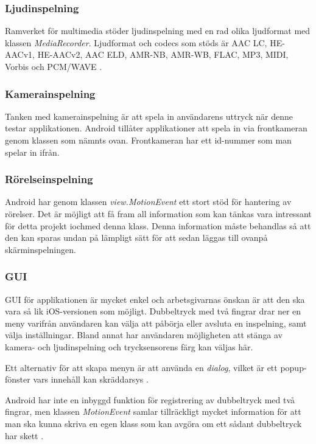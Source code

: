 \subsubsection{Ljudinspelning}
\label{subsubsec:ljudinspelning}
Ramverket för multimedia stöder ljudinspelning med en rad olika ljudformat med klassen \textit{MediaRecorder}. Ljudformat och codecs som stöds är AAC LC, HE-AACv1, HE-AACv2, AAC ELD, AMR-NB, AMR-WB, FLAC, MP3, MIDI, Vorbis och PCM/WAVE \parencite{sound}.

\subsubsection{Kamerainspelning}
\label{subsubsec:kamerainspelning}
Tanken med kamerainspelning är att spela in användarens uttryck när denne testar applikationen. Android tillåter applikationer att spela in via frontkameran genom klassen  \parencite{frontcamera} som nämnts ovan. Frontkameran har ett id-nummer som man spelar in ifrån.

\subsubsection{Rörelseinspelning}
Android har genom klassen \emph{view.MotionEvent}\parencite{motionevent} ett stort stöd för hantering av rörelser. Det är möjligt att få fram all information som kan tänkas vara intressant för detta projekt iochmed denna klass. Denna information måste behandlas så att den kan sparas undan på lämpligt sätt för att sedan läggas till ovanpå skärminspelningen.

\subsubsection{GUI}
\label{subsubsec:gui}
GUI för applikationen är mycket enkel och arbetsgivarnas önskan är att den ska vara så lik iOS-versionen som möjligt. Dubbeltryck med två fingrar drar ner en meny varifrån användaren kan välja att påbörja eller avsluta en inspelning, samt välja inställningar. Bland annat har användaren möjligheten att stänga av kamera- och ljudinspelning och trycksensorens färg kan väljas här. 

Ett alternativ för att skapa menyn är att använda en \textit{dialog}, vilket är ett popup-fönster vars innehåll kan skräddarsys \parencite{dialog}. 

Android har inte en inbyggd funktion för registrering av dubbeltryck med två fingrar, men klassen \textit{MotionEvent} samlar tillräckligt mycket information för att man ska kunna skriva en egen klass som kan avgöra om ett sådant dubbeltryck har skett \parencite{dbletap}.

